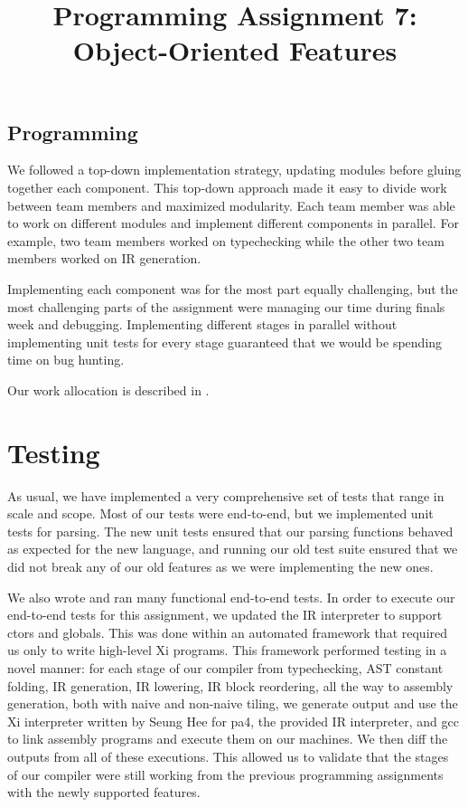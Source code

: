 \documentclass{hw} \title{Programming Assignment 7:\\ Object-Oriented Features}
\begin{document}
\subsection{Programming} We followed a top-down implementation strategy,
updating modules before gluing together each
component. This top-down approach made it easy to divide work between team
members and maximized modularity. Each team member was able to work on
different modules and implement different components in parallel. For example,
two team members worked on typechecking while the other two team members worked on IR generation.

Implementing each component was for the most part equally challenging, but the most challenging parts of the assignment were managing our time during finals week and debugging. Implementing different stages in parallel without implementing unit tests for every stage guaranteed that we would be spending time on bug hunting.

Our work allocation is described in .

\section{Testing}\label{sec:testing} As usual, we have implemented a very
comprehensive set of tests that range in scale and scope. Most of our tests were end-to-end, but we implemented unit tests for parsing. The new unit tests ensured that our parsing functions behaved as
expected for the new language, and running our old test suite  ensured that we did not break any of our old features as we were implementing the new ones.

We also wrote and ran many functional end-to-end tests. In order to execute our end-to-end tests for this assignment, we updated the IR interpreter to support ctors and globals.  This was done within an automated
framework that required us only to write high-level Xi programs. This framework
performed testing in a novel manner: for each stage of our compiler from
typechecking, AST constant folding, IR generation, IR lowering, IR block
reordering, all the way to assembly generation, both with naive and non-naive
tiling, we generate output and use the Xi interpreter written by Seung Hee for
pa4, the provided IR interpreter, and gcc to link assembly programs and execute
them on our machines. We then diff the outputs from all of these executions.
This allowed us to validate that the stages of our compiler were still working
from the previous programming assignments with the newly supported features.
\end{document}
